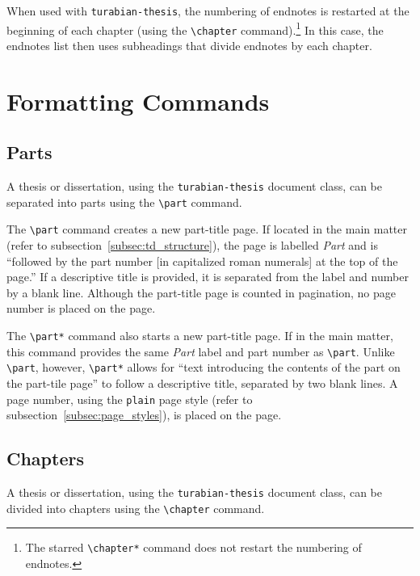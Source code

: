 \documentclass{article}
\newcommand{\textcmd}[1]{\texttt{\textbackslash #1}}
\begin{document}
When used with \texttt{turabian-thesis}, the numbering of endnotes is restarted at the beginning of each chapter (using the \textcmd{chapter} command).\footnote{%
	The starred \textcmd{chapter*} command does not restart the numbering of endnotes.}
In this case, the endnotes list then uses subheadings that divide endnotes by each chapter.\autocite[162]{turabian_manual_2018}


\clearpage
\section{Formatting Commands}
\label{sec:formatting_commands}


\subsection{Parts}
\label{subsec:parts}

A thesis or dissertation, using the \texttt{turabian-thesis} document class, can be separated into parts using the \textcmd{part} command. 

The \textcmd{part} command creates a new part-title page. If located in the main matter (refer to subsection~\ref{subsec:td_structure}), the page is labelled \emph{Part} and is ``followed by the part number [in capitalized roman numerals] at the top of the page.'' If a descriptive title is provided, it is separated from the label and number by a blank line. Although the part-title page is counted in pagination, no page number is placed on the page.\autocite[402]{turabian_manual_2018}

The \textcmd{part*} command also starts a new part-title page. If in the main matter, this command provides the same \emph{Part} label and part number as \textcmd{part}. Unlike \textcmd{part}, however, \textcmd{part*} allows for ``text introducing the contents of the part on the part-tile page'' to follow a descriptive title, separated by two blank lines. A page number, using the \texttt{plain} page style (refer to subsection~\ref{subsec:page_styles}), is placed on the page.\autocite[402]{turabian_manual_2018}


\subsection{Chapters}
\label{subsec:chapters}

A thesis or dissertation, using the \texttt{turabian-thesis} document class, can be divided into chapters using the \textcmd{chapter} command.
\end{document}
